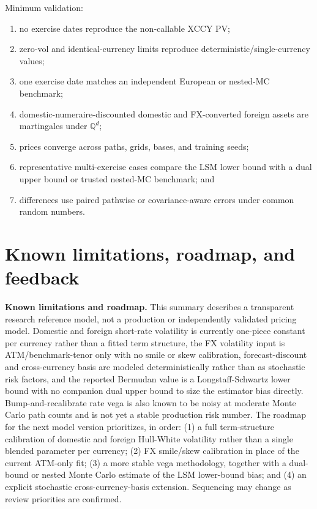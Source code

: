 \documentclass[conference]{IEEEtran}
\newcommand{\Qd}{\mathbb{Q}^{d}}
\begin{document}
Minimum validation:
\begin{enumerate}
  \item no exercise dates reproduce the non-callable XCCY PV;
  \item zero-vol and identical-currency limits reproduce deterministic/single-currency values;
  \item one exercise date matches an independent European or nested-MC benchmark;
  \item domestic-numeraire-discounted domestic and FX-converted foreign assets are martingales under $\Qd$;
  \item prices converge across paths, grids, bases, and training seeds;
  \item representative multi-exercise cases compare the LSM lower bound with a dual upper bound or trusted nested-MC benchmark; and
  \item differences use paired pathwise or covariance-aware errors under common random numbers.
\end{enumerate}

\section{Known limitations, roadmap, and feedback}

\textbf{Known limitations and roadmap.} This summary describes a transparent research reference model, not a production or independently validated pricing model. Domestic and foreign short-rate volatility is currently one-piece constant per currency rather than a fitted term structure, the FX volatility input is ATM/benchmark-tenor only with no smile or skew calibration, forecast-discount and cross-currency basis are modeled deterministically rather than as stochastic risk factors, and the reported Bermudan value is a Longstaff-Schwartz lower bound with no companion dual upper bound to size the estimator bias directly. Bump-and-recalibrate rate vega is also known to be noisy at moderate Monte Carlo path counts and is not yet a stable production risk number. The roadmap for the next model version prioritizes, in order: (1) a full term-structure calibration of domestic and foreign Hull-White volatility rather than a single blended parameter per currency; (2) FX smile/skew calibration in place of the current ATM-only fit; (3) a more stable vega methodology, together with a dual-bound or nested Monte Carlo estimate of the LSM lower-bound bias; and (4) an explicit stochastic cross-currency-basis extension. Sequencing may change as review priorities are confirmed.
\end{document}
